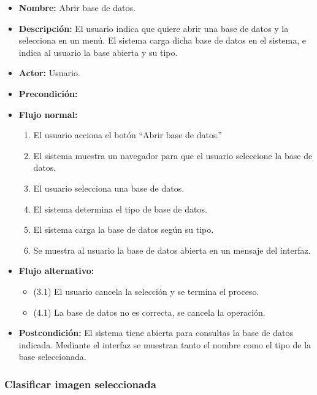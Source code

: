 \begin{itemize}
\item \textbf{Nombre: }Abrir base de datos.
\item \textbf{Descripción: }El usuario indica que quiere abrir una base de datos y la selecciona en un menú. El sistema carga dicha base de datos en el sistema, e indica al usuario la base abierta y su tipo.
\item \textbf{Actor: }Usuario.
\item \textbf{Precondición: }
\item \textbf{Flujo normal: }
\begin{enumerate}
\item El usuario acciona el botón ``Abrir base de datos.''
\item El sistema muestra un navegador para que el usuario seleccione la base de datos.
\item El usuario selecciona una base de datos.
\item El sistema determina el tipo de base de datos.
\item El sistema carga la base de datos según su tipo.
\item Se muestra al usuario la base de datos abierta en un mensaje del interfaz.
\end{enumerate}
\item \textbf{Flujo alternativo:}
\begin{itemize}
\item (3.1) El usuario cancela la selección y se termina el proceso.
\item (4.1) La base de datos no es correcta, se cancela la operación.
\end{itemize}
\item \textbf{Postcondición: } El sistema tiene abierta para consultas la base de datos indicada. Mediante el interfaz se muestran tanto el nombre como el tipo de la base seleccionada.
\end{itemize}

\newpage

\subsubsection{Clasificar imagen seleccionada}

